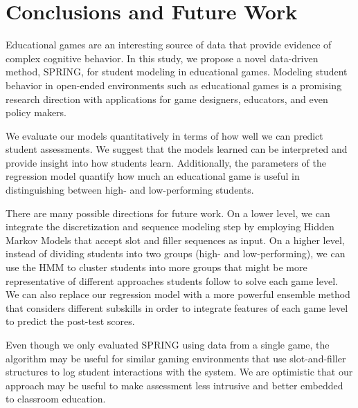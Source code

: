 \documentclass{sigchi}
\def\algname{SPRING\xspace}
\begin{document}
	\section{Conclusions and Future Work}
	\label{sec:conclusion} 
	
	Educational games are an interesting source of data that provide evidence of complex cognitive behavior.
	In this study, we propose a novel data-driven method, \algname,  for student modeling in educational games. 	
	Modeling student behavior in open-ended environments such as educational games is a promising research direction with applications for game designers, educators, and even policy makers.
	
	We evaluate our models quantitatively in terms of how well we can predict student assessments.
	We suggest that the models learned can be interpreted and provide insight into how students learn.
	Additionally, the parameters of the regression model quantify how much an educational game is useful in distinguishing between high- and low-performing students.
	
	There are many possible directions for future work. 
	On a lower level, we can integrate the discretization and sequence modeling step by employing Hidden Markov Models that accept slot and filler sequences as input.
	On a higher level, instead of dividing students into two groups (high- and low-performing), we can use the HMM to cluster students \cite{bicego2003similarity,smyth1997clustering} into more groups that might be  more representative of different approaches students follow to solve each game level. 
	We can also replace our regression model with a more powerful ensemble method that considers different subskills in order to integrate features of each game level to predict the post-test scores.
	
	Even though we only evaluated \algname using data from a single game, the algorithm  may be useful for similar gaming environments that use slot-and-filler structures to log student interactions with the system. 
	We are optimistic that our approach may be useful to make assessment less intrusive and better embedded to classroom education.

	
	\balance
	
	
\end{document}
